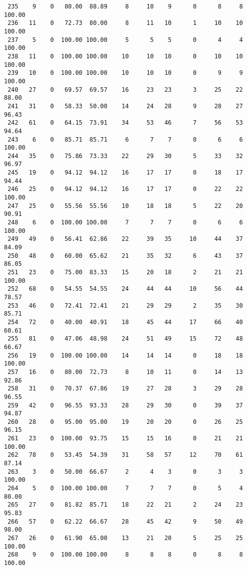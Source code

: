 \begin{verbatim}
 235    9    0   80.00  88.89     8     10    9      0      8     8   100.00
 236   11    0   72.73  80.00     8     11   10      1     10    10   100.00
 237    5    0  100.00 100.00     5      5    5      0      4     4   100.00
 238   11    0  100.00 100.00    10     10   10      0     10    10   100.00
 239   10    0  100.00 100.00    10     10   10      0      9     9   100.00
 240   27    0   69.57  69.57    16     23   23      3     25    22    88.00
 241   31    0   58.33  50.00    14     24   28      9     28    27    96.43
 242   61    0   64.15  73.91    34     53   46      7     56    53    94.64
 243    6    0   85.71  85.71     6      7    7      0      6     6   100.00
 244   35    0   75.86  73.33    22     29   30      5     33    32    96.97
 245   19    0   94.12  94.12    16     17   17      0     18    17    94.44
 246   25    0   94.12  94.12    16     17   17      0     22    22   100.00
 247   25    0   55.56  55.56    10     18   18      5     22    20    90.91
 248    6    0  100.00 100.00     7      7    7      0      6     6   100.00
 249   49    0   56.41  62.86    22     39   35     10     44    37    84.09
 250   48    0   60.00  65.62    21     35   32      6     43    37    86.05
 251   23    0   75.00  83.33    15     20   18      2     21    21   100.00
 252   68    0   54.55  54.55    24     44   44     10     56    44    78.57
 253   46    0   72.41  72.41    21     29   29      2     35    30    85.71
 254   72    0   40.00  40.91    18     45   44     17     66    40    60.61
 255   81    0   47.06  48.98    24     51   49     15     72    48    66.67
 256   19    0  100.00 100.00    14     14   14      0     18    18   100.00
 257   16    0   80.00  72.73     8     10   11      0     14    13    92.86
 258   31    0   70.37  67.86    19     27   28      3     29    28    96.55
 259   42    0   96.55  93.33    28     29   30      0     39    37    94.87
 260   28    0   95.00  95.00    19     20   20      0     26    25    96.15
 261   23    0  100.00  93.75    15     15   16      0     21    21   100.00
 262   78    0   53.45  54.39    31     58   57     12     70    61    87.14
 263    3    0   50.00  66.67     2      4    3      0      3     3   100.00
 264    5    0  100.00 100.00     7      7    7      0      5     4    80.00
 265   27    0   81.82  85.71    18     22   21      2     24    23    95.83
 266   57    0   62.22  66.67    28     45   42      9     50    49    98.00
 267   26    0   61.90  65.00    13     21   20      5     25    25   100.00
 268    9    0  100.00 100.00     8      8    8      0      8     8   100.00

\end{verbatim}
